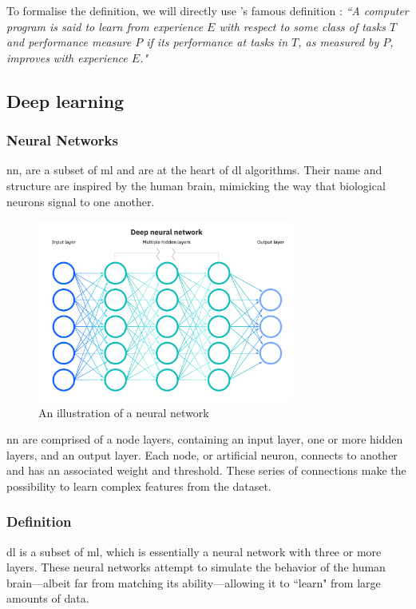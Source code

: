 To formalise the definition, we will directly use \citeauthor{MachineLearning}'s famous definition \cite[page.~2]{MachineLearning}: \textit{``A computer program is said to learn from experience $E$ with respect to some class of tasks $T$ and performance measure $P$ if its performance at tasks in $T$, as measured by $P$, improves with experience $E$."}

\subsection{Deep learning}
\subsubsection{Neural Networks}
\acrfull{nn}, are a subset of \acrfull{ml} and are at the heart of \acrfull{dl} algorithms. Their name and structure are inspired by the human brain, mimicking the way that biological neurons signal to one another.

\begin{figure}[H]
	\centering
	\includegraphics[width=0.75\textwidth]{Figures/NeuralNetwork.png}
	\caption{An illustration of a neural network}
\end{figure}
\FloatBarrier

\acrshort{nn} are comprised of a node layers, containing an input layer, one or more hidden layers, and an output layer. Each node, or artificial neuron, connects to another and has an associated weight and threshold. These series of connections make the possibility to learn complex features from the dataset.

\subsubsection{Definition}
\acrfull{dl} is a subset of \acrfull{ml}, which is essentially a neural network with three or more layers. These neural networks attempt to simulate the behavior of the human brain—albeit far from matching its ability—allowing it to ``learn" from large amounts of data. 

